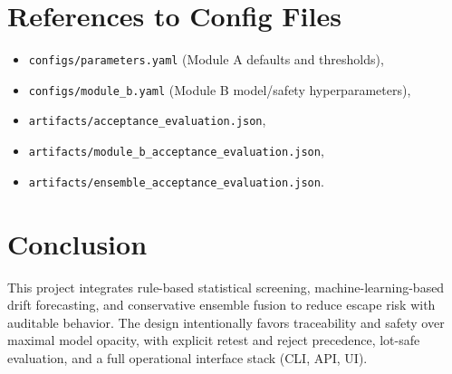 \documentclass[11pt]{article}
\begin{document}
\section{References to Config Files}
\begin{itemize}[nosep]
  \item \texttt{configs/parameters.yaml} (Module A defaults and thresholds),
  \item \texttt{configs/module\_b.yaml} (Module B model/safety hyperparameters),
  \item \texttt{artifacts/acceptance\_evaluation.json},
  \item \texttt{artifacts/module\_b\_acceptance\_evaluation.json},
  \item \texttt{artifacts/ensemble\_acceptance\_evaluation.json}.
\end{itemize}

\section{Conclusion}
This project integrates rule-based statistical screening, machine-learning-based drift forecasting, and conservative ensemble fusion to reduce escape risk with auditable behavior.  
The design intentionally favors traceability and safety over maximal model opacity, with explicit retest and reject precedence, lot-safe evaluation, and a full operational interface stack (CLI, API, UI).
\end{document}
